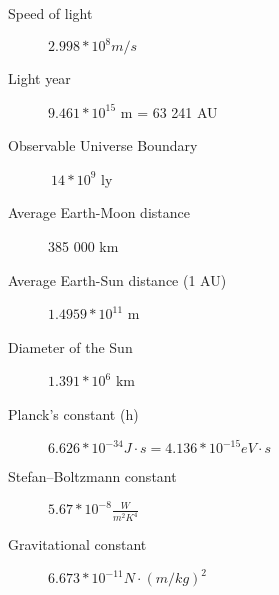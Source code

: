 \begin{description}
\item[Speed of light] $2.998 * 10^8 m/s$
\item[Light year] $9.461 * 10^{15}$ m = 63 241 AU
\item[Observable Universe Boundary] $~14 * 10^9$ ly
\item[Average Earth-Moon distance] 385 000 km
\item[Average Earth-Sun distance (1 AU)] $1.4959 * 10^{11}$ m
\item[Diameter of the Sun] $1.391 * 10^6$ km
\item[Planck's constant (h)] $6.626 * 10^{-34} J \cdot s = 4.136 * 10^{-15} eV \cdot s$
\item[Stefan–Boltzmann constant] $5.67 * 10^{-8} \frac{W}{m^2 K^4}$
\item[Gravitational constant] $6.673 * 10^{-11} N \cdot (m/kg)^2$
\end{description}

